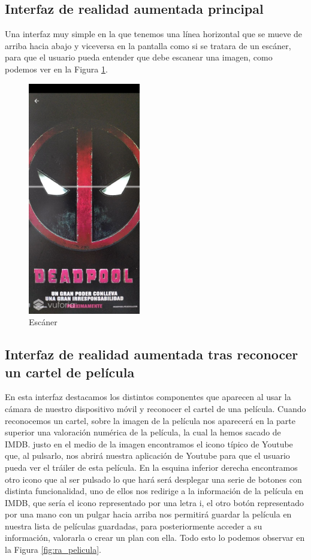 \subsection{Interfaz de realidad aumentada principal}
\label{makereference3.4.4}
Una interfaz muy simple en la que tenemos una línea horizontal que se mueve de arriba hacia abajo y viceversa en la pantalla como si se tratara de un escáner, para que el usuario
pueda entender que debe escanear una imagen, como podemos ver en la Figura \ref{fig:escaner}.
\begin{figure}[H]
    \centering
    \includegraphics[height=4in]{figures/escaner.jpg}
    \caption{Escáner}
    \label{fig:escaner}
\end{figure}
\subsection{Interfaz de realidad aumentada tras reconocer un cartel de película}
\label{makereference3.4.5}
En esta interfaz destacamos los distintos componentes que aparecen al usar la cámara de nuestro dispositivo móvil y reconocer el cartel de una película.
Cuando reconocemos un cartel, sobre la imagen de la película nos aparecerá en la parte superior una valoración numérica de la película, la cual la hemos 
sacado de IMDB. justo en el medio de la imagen encontramos el icono típico de Youtube que, al pulsarlo, nos abrirá nuestra aplicación de Youtube para que
el usuario pueda ver el tráiler de esta película. En la esquina inferior derecha encontramos otro icono que al ser pulsado lo que hará será desplegar una serie de botones con distinta funcionalidad,
uno de ellos nos redirige a la información de la película en IMDB, que sería el icono representado por una letra i, el otro botón representado por una mano con un pulgar hacia arriba nos permitirá
guardar la película en nuestra lista de películas guardadas, para posteriormente acceder a su información, valorarla o crear un plan con ella. Todo esto lo podemos observar en la Figura \ref{fig:ra_pelicula}.

